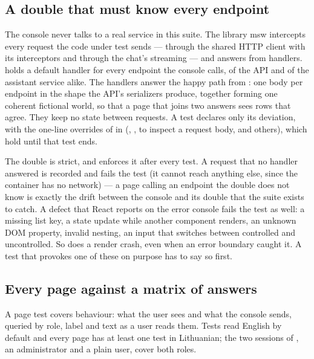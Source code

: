 \subsection{A double that must know every endpoint}\label{sec:testing:console:double}

The console never talks to a real service in this suite. The library msw intercepts every
request the code under test sends --- through the shared HTTP client with its interceptors and
through the chat's streaming  --- and answers from handlers.
 holds a default handler for every endpoint the
console calls, of the API and of the assistant service alike. The handlers answer the happy
path from : one body per endpoint in the shape the
API's serializers produce, together forming one coherent fictional world, so that a page that
joins two answers sees rows that agree. They keep no state between requests. A test declares
only its deviation, with the one-line overrides of  in
 (, ,
 to inspect a request body, and others), which hold until that test ends.

The double is strict, and  enforces it after every test. A
request that no handler answered is recorded and fails the test (it cannot reach anything
else, since the container has no network)
--- a page calling an endpoint the double does not know is exactly the drift between the
console and its double that the suite exists to catch. A defect that React reports on the
error console fails the test as well: a missing list key, a state update while another
component renders, an unknown DOM property, invalid nesting, an input that switches between
controlled and uncontrolled. So does a render crash, even when an error boundary caught it. A
test that provokes one of these on purpose has to say so first.

\subsection{Every page against a matrix of answers}\label{sec:testing:console:matrix}

A page test covers behaviour: what the user sees and what the console sends, queried by role,
label and text as a user reads them. Tests read English by default and every page has at
least one test in Lithuanian; the two sessions of , an
administrator and a plain user, cover both roles.

